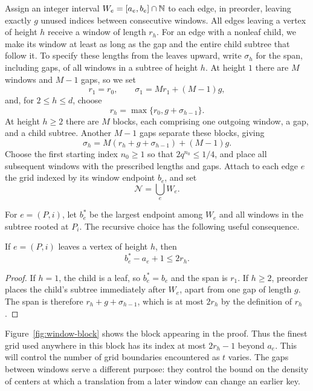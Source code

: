 Assign an integer interval $W_e=[a_e,b_e]\cap\mathbb N$ to each edge, in
preorder, leaving exactly $g$ unused indices between consecutive
windows.  All edges leaving a vertex of height $h$ receive a window of
length $r_h$.  For an edge with a nonleaf child, we make its window at
least as long as the gap and the entire child subtree that follow it.
To specify these lengths from the leaves upward, write $\sigma_h$ for
the span, including gaps, of all windows in a subtree of height $h$.
At height $1$ there are $M$ windows and $M-1$ gaps, so we set
\[
 r_1=r_0,\qquad \sigma_1=Mr_1+(M-1)g,
\]
and, for $2\le h\le d$, choose
\[
 r_h=\max\{r_0,g+\sigma_{h-1}\}.
\]
At height $h\ge2$ there are $M$ blocks, each comprising one outgoing
window, a gap, and a child subtree.  Another $M-1$ gaps separate these
blocks, giving
\[
 \sigma_h=M(r_h+g+\sigma_{h-1})+(M-1)g.
\]
Choose the first starting index $n_0\ge1$ so that
$2q^{n_0}\le1/4$, and place all subsequent windows with the prescribed
lengths and gaps.  Attach to each edge $e$ the grid indexed by its window
endpoint $b_e$, and set
\[
 \mathcal N=\bigcup_e W_e.
\]

For $e=(P,i)$, let $b_e^*$ be the largest endpoint among $W_e$ and all
windows in the subtree rooted at $P_i$.  The recursive choice has the
following useful consequence.

\begin{lemma}\label{lem:window-span}
If $e=(P,i)$ leaves a vertex of height $h$, then
\begin{equation}\label{eq:window-span}
 b_e^*-a_e+1\le2r_h.
\end{equation}
\end{lemma}

\begin{proof}
If $h=1$, the child is a leaf, so $b_e^*=b_e$ and the span is $r_1$.
If $h\ge2$, preorder places the child's subtree immediately after
$W_e$, apart from one gap of length $g$.  The span is therefore
$r_h+g+\sigma_{h-1}$, which is at most $2r_h$ by the definition of
$r_h$.
\end{proof}

Figure~\ref{fig:window-block} shows the block appearing in the proof.
Thus the finest grid used anywhere in this block has its index at most
$2r_h-1$ beyond $a_e$.  This will control the number of grid boundaries
encountered as $t$ varies.  The gaps between windows serve a different
purpose: they control the bound on the density of centers at which a
translation from a later window can change an earlier key.

